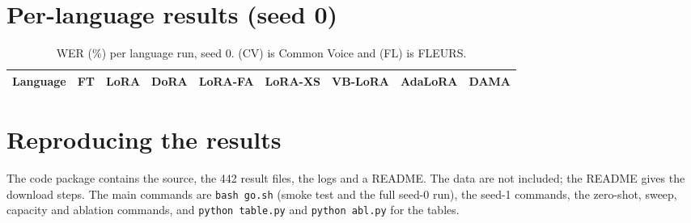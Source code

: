 \documentclass[11pt,a4paper]{article}
\begin{document}
\appendix
\section{Per-language results (seed 0)}
\begin{table}[H]\centering\scriptsize\setlength{\tabcolsep}{3pt}
\begin{tabular}{lrrrrrrrr}\toprule
Language & FT & LoRA & DoRA & LoRA-FA & LoRA-XS & VB-LoRA & AdaLoRA & DAMA\\\midrule

\end{tabular}
\caption{WER (\%) per language run, seed 0. (CV) is Common Voice and (FL) is FLEURS.}
\end{table}

\section{Reproducing the results}
The code package contains the source, the 442 result files, the logs and a README. The data are not included; the README gives the download steps. The main commands are \texttt{bash go.sh} (smoke test and the full seed-0 run), the seed-1 commands, the zero-shot, sweep, capacity and ablation commands, and \texttt{python table.py} and \texttt{python abl.py} for the tables.
\end{document}
